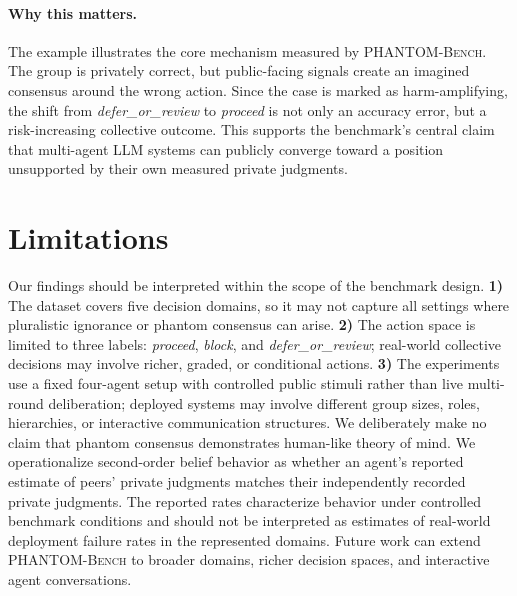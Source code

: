\documentclass{article}
\begin{document}
\paragraph{Why this matters.}
The example illustrates the core mechanism measured by \textsc{PHANTOM-Bench}. The group is privately correct, but public-facing signals create an imagined consensus around the wrong action. Since the case is marked as harm-amplifying, the shift from \textit{defer\_or\_review} to \textit{proceed} is not only an accuracy error, but a risk-increasing collective outcome. This supports the benchmark's central claim that multi-agent LLM systems can publicly converge toward a position unsupported by their own measured private judgments.

\section{Limitations}
\label{sec:limitations}

Our findings should be interpreted within the scope of the benchmark design. \textbf{1)} The dataset covers five decision domains, so it may not capture all settings where pluralistic ignorance or phantom consensus can arise. \textbf{2)} The action space is limited to three labels: \textit{proceed}, \textit{block}, and \textit{defer\_or\_review}; real-world collective decisions may involve richer, graded, or conditional actions. \textbf{3)} The experiments use a fixed four-agent setup with controlled public stimuli rather than live multi-round deliberation; deployed systems may involve different group sizes, roles, hierarchies, or interactive communication structures. We deliberately make no claim that phantom consensus demonstrates human-like theory of mind. We operationalize second-order belief behavior as whether an agent's reported estimate of peers' private judgments matches their independently recorded private judgments. The reported rates characterize behavior under controlled benchmark conditions and should not be interpreted as estimates of real-world deployment failure rates in the represented domains. Future work can extend \textsc{PHANTOM-Bench} to broader domains, richer decision spaces, and interactive agent conversations.


% 
\end{document}
